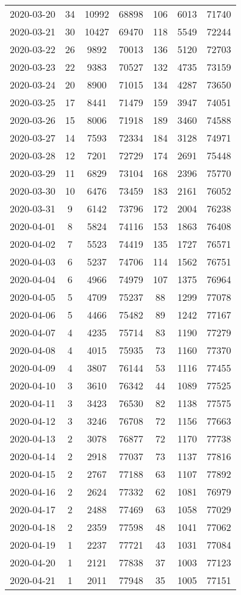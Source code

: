 \begin{longtable}{ccccccc}
2020-03-20&34&10992&68898&106&6013&71740\\
2020-03-21&30&10427&69470&118&5549&72244\\
2020-03-22&26&9892&70013&136&5120&72703\\
2020-03-23&22&9383&70527&132&4735&73159\\
2020-03-24&20&8900&71015&134&4287&73650\\
2020-03-25&17&8441&71479&159&3947&74051\\
2020-03-26&15&8006&71918&189&3460&74588\\
2020-03-27&14&7593&72334&184&3128&74971\\
2020-03-28&12&7201&72729&174&2691&75448\\
2020-03-29&11&6829&73104&168&2396&75770\\
2020-03-30&10&6476&73459&183&2161&76052\\
2020-03-31&9&6142&73796&172&2004&76238\\
2020-04-01&8&5824&74116&153&1863&76408\\
2020-04-02&7&5523&74419&135&1727&76571\\
2020-04-03&6&5237&74706&114&1562&76751\\
2020-04-04&6&4966&74979&107&1375&76964\\
2020-04-05&5&4709&75237&88&1299&77078\\
2020-04-06&5&4466&75482&89&1242&77167\\
2020-04-07&4&4235&75714&83&1190&77279\\
2020-04-08&4&4015&75935&73&1160&77370\\
2020-04-09&4&3807&76144&53&1116&77455\\
2020-04-10&3&3610&76342&44&1089&77525\\
2020-04-11&3&3423&76530&82&1138&77575\\
2020-04-12&3&3246&76708&72&1156&77663\\
2020-04-13&2&3078&76877&72&1170&77738\\
2020-04-14&2&2918&77037&73&1137&77816\\
2020-04-15&2&2767&77188&63&1107&77892\\
2020-04-16&2&2624&77332&62&1081&76979\\
2020-04-17&2&2488&77469&63&1058&77029\\
2020-04-18&2&2359&77598&48&1041&77062\\
2020-04-19&1&2237&77721&43&1031&77084\\
2020-04-20&1&2121&77838&37&1003&77123\\
2020-04-21&1&2011&77948&35&1005&77151\\

\end{longtable}

